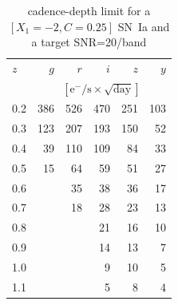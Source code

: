 \documentclass[\docopts]{\docclass}
\begin{document}
\begin{table}[t]
\begin{center}
\caption{cadence-depth limit for a $[X_1=-2, C=0.25]$ SN~Ia and a target SNR=20/band}
\label{tab:cadence_depth_limit}
\begin{tabular}{l|rrrrr}
\hline
\hline
    $z$   &      $g$         &       $r$         &     $i$           &      $z$        &      $y$           \\
          &      \multicolumn{5}{c}{$[\mathrm{e^-/s \times \sqrt{day}}]$} \\
\hline
     0.2  &     386 &     526 &     470 &     251 &     103   \\
     0.3  &     123 &     207 &     193 &     150 &      52   \\
     0.4  &      39 &     110 &     109 &      84 &      33   \\
     0.5  &      15 &      64 &      59 &      51 &      27   \\
     0.6  &         &      35 &      38 &      36 &      17   \\
     0.7  &         &      18 &      28 &      23 &      13   \\
     0.8  &         &         &      21 &      16 &      10   \\
     0.9  &         &         &      14 &      13 &       7   \\
     1.0  &         &         &       9 &      10 &       5   \\
     1.1  &         &         &       5 &       8 &       4   \\
 
\hline
\end{tabular}
\end{center}
\end{table}
\end{document}
